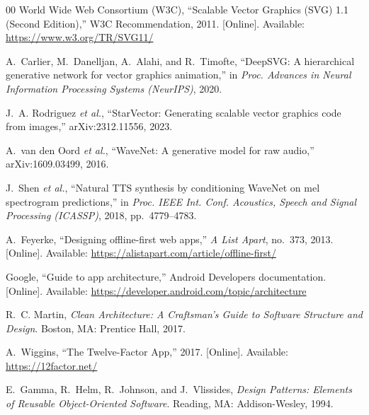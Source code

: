 \begin{thebibliography}{00}
 World Wide Web Consortium (W3C), ``Scalable Vector Graphics
(SVG) 1.1 (Second Edition),'' W3C Recommendation, 2011. [Online]. Available:
\url{https://www.w3.org/TR/SVG11/}

 A.~Carlier, M.~Danelljan, A.~Alahi, and
R.~Timofte, ``DeepSVG: A hierarchical generative network for vector graphics
animation,'' in \emph{Proc. Advances in Neural Information Processing Systems
(NeurIPS)}, 2020.

 J.~A. Rodriguez \emph{et al.}, ``StarVector:
Generating scalable vector graphics code from images,'' arXiv:2312.11556, 2023.

 A.~van den Oord \emph{et al.}, ``WaveNet: A generative
model for raw audio,'' arXiv:1609.03499, 2016.

 J.~Shen \emph{et al.}, ``Natural TTS synthesis by
conditioning WaveNet on mel spectrogram predictions,'' in \emph{Proc. IEEE Int.
Conf. Acoustics, Speech and Signal Processing (ICASSP)}, 2018, pp.~4779--4783.

 A.~Feyerke, ``Designing offline-first web apps,'' \emph{A
List Apart}, no.~373, 2013. [Online]. Available:
\url{https://alistapart.com/article/offline-first/}

 Google, ``Guide to app architecture,'' Android Developers
documentation. [Online]. Available:
\url{https://developer.android.com/topic/architecture}

 R.~C. Martin, \emph{Clean Architecture: A Craftsman's
Guide to Software Structure and Design}. Boston, MA: Prentice Hall, 2017.

 A.~Wiggins, ``The Twelve-Factor App,'' 2017. [Online].
Available: \url{https://12factor.net/}

 E.~Gamma, R.~Helm, R.~Johnson, and J.~Vlissides,
\emph{Design Patterns: Elements of Reusable Object-Oriented Software}. Reading,
MA: Addison-Wesley, 1994.

\end{thebibliography}
